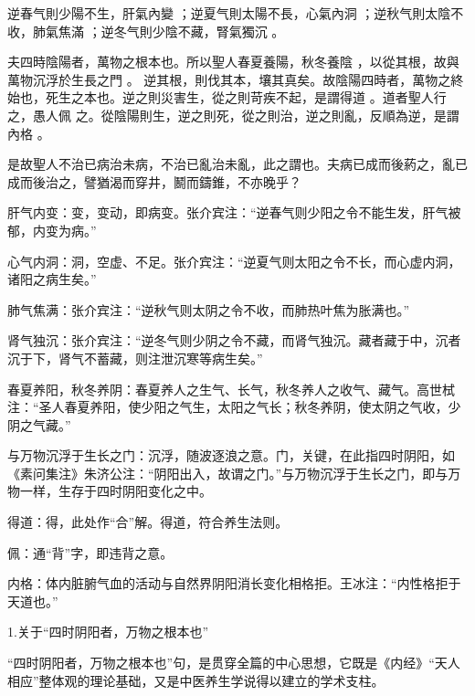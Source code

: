 \documentclass[draft,12pt]{ctexbook}
\begin{document}

\begin{yuanwen}
逆春气則少陽不生，肝氣內變 ；逆夏气則太陽不長，心氣內洞 ；逆秋气則太陰不收，肺氣焦滿 ；逆冬气則少陰不藏，腎氣獨沉 。

夫四時陰陽者，萬物之根本也。所以聖人春夏養陽，秋冬養陰 ，以從其根，故與萬物沉浮於生長之門 。 逆其根，則伐其本，壤其真矣。故陰陽四時者，萬物之終始也，死生之本也。逆之則災害生，從之則苛疾不起，是謂得道 。道者聖人行之，愚人佩 之。從陰陽則生，逆之則死，從之則治，逆之則亂，反順為逆，是謂內格 。

是故聖人不治已病治未病，不治已亂治未亂，此之謂也。夫病已成而後葯之，亂已成而後治之，譬猶渴而穿井，鬭而鑄錐，不亦晚乎？
\end{yuanwen}


\begin{jiaozhu}
	\item 肝气内变：变，变动，即病变。张介宾注：“逆春气则少阳之令不能生发，肝气被郁，内变为病。”
	\item 心气内洞：洞，空虚、不足。张介宾注：“逆夏气则太阳之令不长，而心虚内洞，诸阳之病生矣。”
	\item 肺气焦满：张介宾注：“逆秋气则太阴之令不收，而肺热叶焦为胀满也。”
	\item 肾气独沉：张介宾注：“逆冬气则少阴之令不藏，而肾气独沉。藏者藏于中，沉者沉于下，肾气不蓄藏，则注泄沉寒等病生矣。”
	\item 春夏养阳，秋冬养阴：春夏养人之生气、长气，秋冬养人之收气、藏气。高世栻注：“圣人春夏养阳，使少阳之气生，太阳之气长；秋冬养阴，使太阴之气收，少阴之气藏。”
	\item 与万物沉浮于生长之门：沉浮，随波逐浪之意。门，关键，在此指四时阴阳，如《素问集注》朱济公注：“阴阳出入，故谓之门。”与万物沉浮于生长之门，即与万物一样，生存于四时阴阳变化之中。
	\item 得道：得，此处作“合”解。得道，符合养生法则。
	\item 佩：通“背”字，即违背之意。
	\item 内格：体内脏腑气血的活动与自然界阴阳消长变化相格拒。王冰注：“内性格拒于天道也。”
\end{jiaozhu}


1.关于“四时阴阳者，万物之根本也”

“四时阴阳者，万物之根本也”句，是贯穿全篇的中心思想，它既是《内经》“天人相应”整体观的理论基础，又是中医养生学说得以建立的学术支柱。
\end{document}
